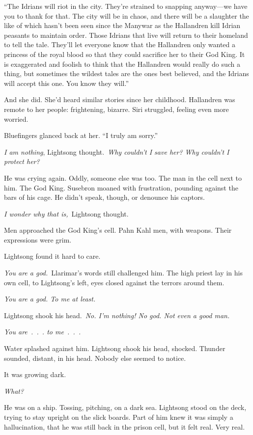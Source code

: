 “The Idrians will riot in the city. They’re strained to snapping anyway—we have you to thank for that. The city will be in chaos, and there will be a slaughter the like of which hasn’t been seen since the Manywar as the Hallandren kill Idrian peasants to maintain order. Those Idrians that live will return to their homeland to tell the tale. They’ll let everyone know that the Hallandren only wanted a princess of the royal blood so that they could sacrifice her to their God King. It is exaggerated and foolish to think that the Hallandren would really do such a thing, but sometimes the wildest tales are the ones best believed, and the Idrians will accept this one. You know they will.”

And she did. She’d heard similar stories since her childhood. Hallandren was remote to her people: frightening, bizarre. Siri struggled, feeling even more worried.

Bluefingers glanced back at her. “I truly am sorry.”

\orn

\textit{I am nothing}, Lightsong thought.~\textit{Why couldn’t I save her? Why couldn’t I protect her?}

He was crying again. Oddly, someone else was too. The man in the cell next to him. The God King. Susebron moaned with frustration, pounding against the bars of his cage. He didn’t speak, though, or denounce his captors.

\textit{I wonder why that is,}~Lightsong thought.

Men approached the God King’s cell. Pahn Kahl men, with weapons. Their expressions were grim.

Lightsong found it hard to care.

\textit{You are a god.}~Llarimar’s words still challenged him. The high priest lay in his own cell, to Lightsong’s left, eyes closed against the terrors around them.

\textit{You are a god. To me at least.}

Lightsong shook his head.~\textit{No. I’m nothing! No god. Not even a good man.}

\textit{You are~.~.~. to me~.~.~.}

Water splashed against him. Lightsong shook his head, shocked. Thunder sounded, distant, in his head. Nobody else seemed to notice.

It was growing dark.

\textit{What?}

He was on a ship. Tossing, pitching, on a dark sea. Lightsong stood on the deck, trying to stay upright on the slick boards. Part of him knew it was simply a hallucination, that he was still back in the prison cell, but it felt real. Very real.


